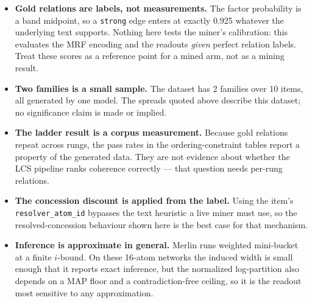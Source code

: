 \documentclass[11pt]{article}
\begin{document}
\begin{itemize}
\item \textbf{Gold relations are labels, not measurements.} The factor probability is a band midpoint, so a \texttt{strong} edge enters at exactly 0.925 whatever the underlying text supports. Nothing here tests the miner's calibration: this evaluates the MRF encoding and the readouts \emph{given} perfect relation labels. Treat these scores as a reference point for a mined arm, not as a mining result.
\item \textbf{Two families is a small sample.} The dataset has 2 families over 10 items, all generated by one model. The spreads quoted above describe this dataset; no significance claim is made or implied.
\item \textbf{The ladder result is a corpus measurement.} Because gold relations repeat across rungs, the pass rates in the ordering-constraint tables report a property of the generated data. They are not evidence about whether the LCS pipeline ranks coherence correctly --- that question needs per-rung relations.
\item \textbf{The concession discount is applied from the label.} Using the item's \texttt{resolver\_atom\_id} bypasses the text heuristic a live miner must use, so the resolved-concession behaviour shown here is the best case for that mechanism.
\item \textbf{Inference is approximate in general.} Merlin runs weighted mini-bucket at a finite $i$-bound. On these 16-atom networks the induced width is small enough that it reports exact inference, but the normalized log-partition also depends on a MAP floor and a contradiction-free ceiling, so it is the readout most sensitive to any approximation.
\end{itemize}
\end{document}
